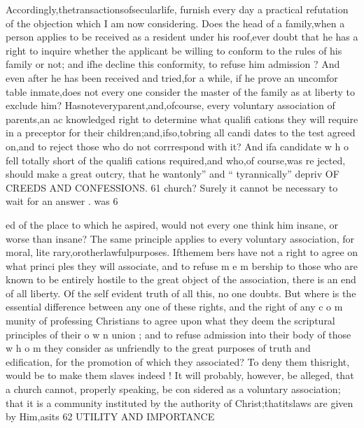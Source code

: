 \documentclass[
]{book}
\begin{document}
Accordingly,thetransactionsofsecularlife, furnish every day a practical refutation of the
objection which I am now considering. Does the head of a family,when a person applies to
be received as a resident under his roof,ever doubt that he has a right to inquire whether
the applicant be willing to conform to the rules of his family or not; and ifhe decline
this conformity, to refuse him admission ? And even after he has been received and
tried,for a while, if he prove an uncomfor table inmate,does not every one consider the master of the family as at liberty to exclude him? Hasnoteveryparent,and,ofcourse, every voluntary association of parents,an ac
knowledged right to determine what qualifi cations they will require in a preceptor for their children;and,ifso,tobring all candi dates to the test agreed on,and to reject those who do not corrrespond with it? And ifa candidate w h o fell totally short of the qualifi cations required,and who,of course,was re jected, should make a great outcry, that he
wantonly'' and `` tyrannically'' depriv
OF CREEDS AND CONFESSIONS. 61
church? Surely it cannot be necessary to wait for an answer .
was
6

ed of the place to which he aspired, would not every one think him insane, or worse than insane? The same principle applies to
every voluntary association, for moral, lite rary,orotherlawfulpurposes. Ifthemem
bers have not a right to agree on what princi ples they will associate, and to refuse m e m bership to those who are known to be entirely
hostile to the great object of the association, there is an end of all liberty. Of the self evident truth of all this, no one doubts. But where is the essential difference between any one of these rights, and the right of any c o m munity of professing Christians to agree upon what they deem the scriptural principles of their o w n union ; and to refuse admission into
their body of those w h o m they consider as unfriendly to the great purposes of truth and edification, for the promotion of which they associated? To deny them thisright, would be to make them slaves indeed !
It will probably, however, be alleged, that a church cannot, properly speaking, be con sidered as a voluntary association; that it is a community instituted by the authority of Christ;thatitslaws are given by Him,asits
62
UTILITY AND IMPORTANCE
\end{document}
